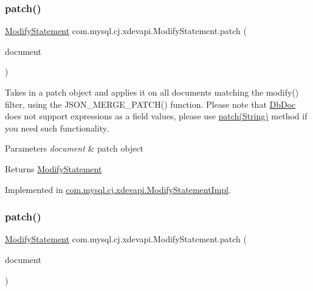 \subsubsection{\texorpdfstring{patch()}{patch()}\hspace{0.1cm}{\footnotesize\ttfamily [1/2]}}
{\footnotesize\ttfamily \mbox{\hyperlink{interfacecom_1_1mysql_1_1cj_1_1xdevapi_1_1_modify_statement}{Modify\+Statement}} com.\+mysql.\+cj.\+xdevapi.\+Modify\+Statement.\+patch (\begin{DoxyParamCaption}\item[{\mbox{\hyperlink{interfacecom_1_1mysql_1_1cj_1_1xdevapi_1_1_db_doc}{Db\+Doc}}}]{document }\end{DoxyParamCaption})}

Takes in a patch object and applies it on all documents matching the modify() filter, using the J\+S\+O\+N\+\_\+\+M\+E\+R\+G\+E\+\_\+\+P\+A\+T\+C\+H() function. Please note that \mbox{\hyperlink{interfacecom_1_1mysql_1_1cj_1_1xdevapi_1_1_db_doc}{Db\+Doc}} does not support expressions as a field values, please use \mbox{\hyperlink{interfacecom_1_1mysql_1_1cj_1_1xdevapi_1_1_modify_statement_afc2985a9cf8d2624c16428d2be2427b4}{patch(\+String)}} method if you need such functionality.


\begin{DoxyParams}{Parameters}
{\em document} & patch object \\
\hline
\end{DoxyParams}
\begin{DoxyReturn}{Returns}
\mbox{\hyperlink{interfacecom_1_1mysql_1_1cj_1_1xdevapi_1_1_modify_statement}{Modify\+Statement}} 
\end{DoxyReturn}


Implemented in \mbox{\hyperlink{classcom_1_1mysql_1_1cj_1_1xdevapi_1_1_modify_statement_impl_a685044daafc9ed7a37d743ac62db9465}{com.\+mysql.\+cj.\+xdevapi.\+Modify\+Statement\+Impl}}.

\mbox{\label{interfacecom_1_1mysql_1_1cj_1_1xdevapi_1_1_modify_statement_afc2985a9cf8d2624c16428d2be2427b4}} 
\subsubsection{\texorpdfstring{patch()}{patch()}\hspace{0.1cm}{\footnotesize\ttfamily [2/2]}}
{\footnotesize\ttfamily \mbox{\hyperlink{interfacecom_1_1mysql_1_1cj_1_1xdevapi_1_1_modify_statement}{Modify\+Statement}} com.\+mysql.\+cj.\+xdevapi.\+Modify\+Statement.\+patch (\begin{DoxyParamCaption}\item[{String}]{document }\end{DoxyParamCaption})}


